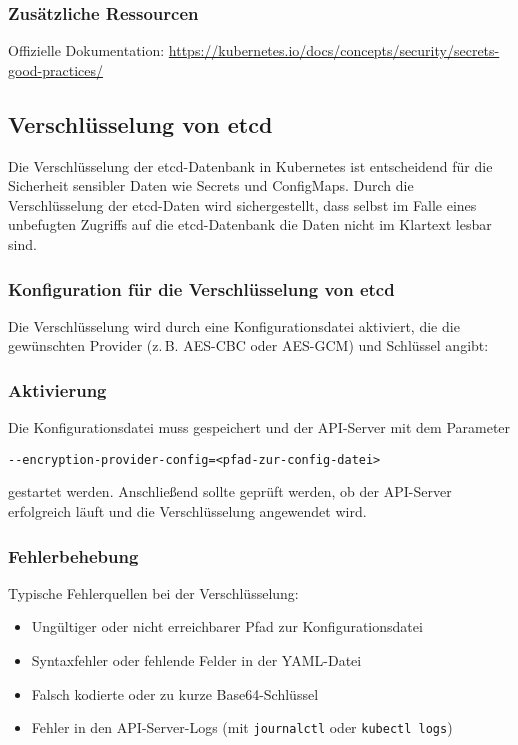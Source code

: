 \subsubsection{Zusätzliche Ressourcen}
Offizielle Dokumentation: \url{https://kubernetes.io/docs/concepts/security/secrets-good-practices/}

\newpage
\subsection{Verschlüsselung von etcd}
Die Verschlüsselung der etcd-Datenbank in Kubernetes ist entscheidend für die Sicherheit sensibler Daten wie Secrets und ConfigMaps. Durch die Verschlüsselung der etcd-Daten wird sichergestellt, dass selbst im Falle eines unbefugten Zugriffs auf die etcd-Datenbank die Daten nicht im Klartext lesbar sind.
\subsubsection{Konfiguration für die Verschlüsselung von etcd}
Die Verschlüsselung wird durch eine Konfigurationsdatei aktiviert, die die gewünschten Provider (z.\,B. AES-CBC oder AES-GCM) und Schlüssel angibt:


\noindent
\subsubsection{Aktivierung}

Die Konfigurationsdatei muss gespeichert und der API-Server mit dem Parameter

\texttt{{-}{-}encryption-provider-config=<pfad-zur-config-datei>}  

\noindent
gestartet werden. Anschließend sollte geprüft werden, ob der API-Server erfolgreich läuft und die Verschlüsselung angewendet wird.

\subsubsection{Fehlerbehebung}
Typische Fehlerquellen bei der Verschlüsselung:

\begin{itemize}
    \item Ungültiger oder nicht erreichbarer Pfad zur Konfigurationsdatei
    \item Syntaxfehler oder fehlende Felder in der YAML-Datei
    \item Falsch kodierte oder zu kurze Base64-Schlüssel
    \item Fehler in den API-Server-Logs (mit \texttt{journalctl} oder \texttt{kubectl logs})
\end{itemize}

